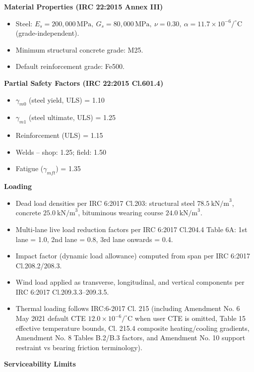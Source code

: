 \documentclass[12pt,a4paper]{report}
\numberwithin{table}{chapter}
\numberwithin{figure}{chapter}
\begin{document}
\textbf{Material Properties (IRC 22:2015 Annex III)}

\begin{itemize}
\item Steel: $E_s = 200{,}000 \, \text{MPa}, \ G_s = 80{,}000 \, \text{MPa}, \ \nu = 0.30, \ \alpha = 11.7 \times 10^{-6}/^\circ\mathrm{C}$ (grade-independent).
\item Minimum structural concrete grade: M25.
\item Default reinforcement grade: Fe500.
\end{itemize}

\textbf{Partial Safety Factors (IRC 22:2015 Cl.601.4)}

\begin{itemize}
\item $\gamma_{m0}$ (steel yield, ULS) = 1.10
\item $\gamma_{m1}$ (steel ultimate, ULS) = 1.25
\item Reinforcement (ULS) = 1.15
\item Welds -- shop: 1.25; field: 1.50
\item Fatigue ($\gamma_{mft}$) = 1.35
\end{itemize}

\textbf{Loading}

\begin{itemize}
\item Dead load densities per IRC 6:2017 Cl.203: structural steel $78.5 \ \text{kN/m}^3$, concrete $25.0 \ \text{kN/m}^3$, bituminous wearing course $24.0 \ \text{kN/m}^3$.
\item Multi-lane live load reduction factors per IRC 6:2017 Cl.204.4 Table 6A: 1st lane = 1.0, 2nd lane = 0.8, 3rd lane onwards = 0.4.
\item Impact factor (dynamic load allowance) computed from span per IRC 6:2017 Cl.208.2/208.3.
\item Wind load applied as transverse, longitudinal, and vertical components per IRC 6:2017 Cl.209.3.3--209.3.5.
\item Thermal loading follows IRC:6-2017 Cl. 215 (including Amendment No. 6 May 2021 default CTE $12.0 \times 10^{-6}/^\circ\mathrm{C}$ when user CTE is omitted, Table 15 effective temperature bounds, Cl. 215.4 composite heating/cooling gradients, Amendment No. 8 Tables B.2/B.3 factors, and Amendment No. 10 support restraint vs bearing friction terminology).
\end{itemize}

\textbf{Serviceability Limits}
\end{document}
